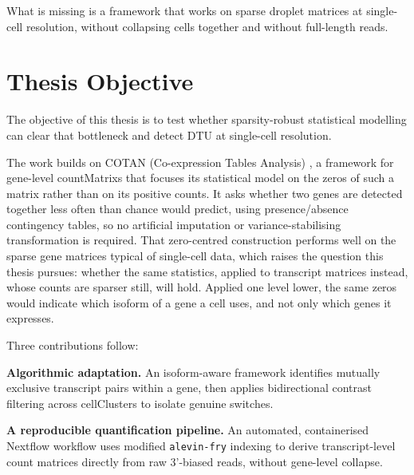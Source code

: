 What is missing is a framework that works on sparse droplet matrices at single-cell resolution, without collapsing cells together and without full-length reads.

\section{Thesis Objective}
The objective of this thesis is to test whether sparsity-robust statistical modelling can clear that bottleneck and detect DTU at single-cell resolution.

The work builds on COTAN (Co-expression Tables Analysis) \cite{galfre2021cotan}, a framework for gene-level \glspl{countMatrix} that focuses its statistical model on the zeros of such a matrix rather than on its positive counts. It asks whether two genes are detected together less often than chance would predict, using presence/absence contingency tables, so no artificial imputation or variance-stabilising transformation is required. That zero-centred construction performs well on the sparse gene matrices typical of single-cell data, which raises the question this thesis pursues: whether the same statistics, applied to transcript matrices instead, whose counts are sparser still, will hold. Applied one level lower, the same zeros would indicate which \gls{isoform} of a gene a cell uses, and not only which genes it expresses.

\newpage

Three contributions follow:

\textbf{Algorithmic adaptation.} An isoform-aware framework identifies mutually exclusive transcript pairs within a gene, then applies bidirectional contrast filtering across \glspl{cellCluster} to isolate genuine switches.

\textbf{A reproducible quantification pipeline.} An automated, containerised Nextflow workflow uses modified \texttt{alevin-fry} indexing to derive transcript-level count matrices directly from raw 3'-biased reads, without gene-level collapse.

